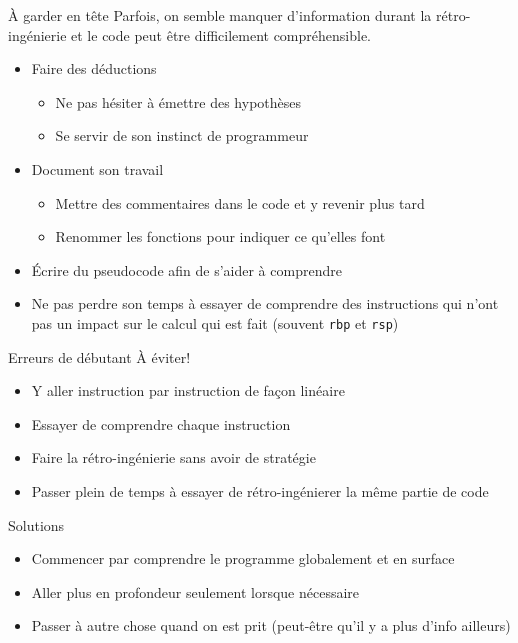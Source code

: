 \documentclass[10pt,xcolor={table,dvipsnames},t]{beamer}
\begin{document}
\begin{frame}{À garder en tête}
    Parfois, on semble manquer d'information durant la rétro-ingénierie et le code peut être difficilement compréhensible. 
    \begin{itemize}
        \item Faire des déductions
        \begin{itemize}
            \item Ne pas hésiter à émettre des hypothèses
            \item Se servir de son instinct de programmeur
        \end{itemize}
        \item Document son travail
        \begin{itemize}
            \item Mettre des commentaires dans le code et y revenir plus tard
            \item Renommer les fonctions pour indiquer ce qu'elles font
        \end{itemize}
        \item Écrire du pseudocode afin de s'aider à comprendre
        \item Ne pas perdre son temps à essayer de comprendre des instructions qui n'ont pas un impact sur le calcul qui est fait (souvent \texttt{rbp} et \texttt{rsp})
    \end{itemize}
\end{frame}


\begin{frame}{Erreurs de débutant}
    À éviter!
    \begin{itemize}
        \item Y aller instruction par instruction de façon linéaire
        \item Essayer de comprendre chaque instruction
        \item Faire la rétro-ingénierie sans avoir de stratégie
        \item Passer plein de temps à essayer de rétro-ingénierer la même partie de code
    \end{itemize}
    Solutions
        \begin{itemize}
        \item Commencer par comprendre le programme globalement et en surface
        \item Aller plus en profondeur seulement lorsque nécessaire
        \item Passer à autre chose quand on est prit (peut-être qu'il y a plus d'info ailleurs)
    \end{itemize}
\end{frame}
\end{document}
